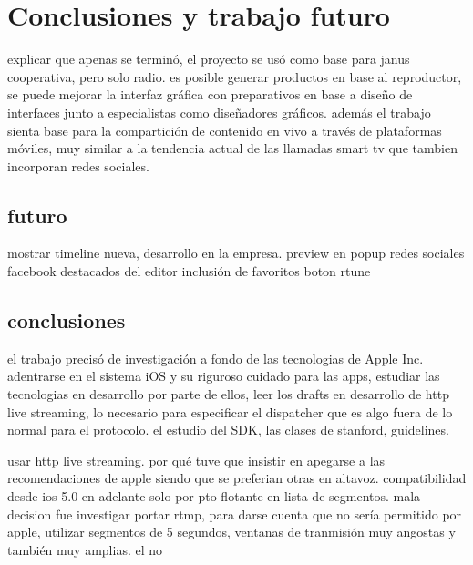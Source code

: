 
\chapter{Conclusiones y trabajo futuro}
explicar que apenas se terminó, el proyecto se usó como base para janus cooperativa, pero solo radio.
es posible generar productos en base al reproductor, se puede mejorar la interfaz gráfica con preparativos en base a diseño de interfaces junto a especialistas como diseñadores gráficos.
además el trabajo sienta base para la compartición de contenido en vivo a través de plataformas móviles, muy similar a la tendencia actual de las llamadas smart tv que tambien incorporan redes sociales.



	\section{futuro}
	mostrar timeline nueva, desarrollo en la empresa.
	preview en popup
	redes sociales facebook
	destacados del editor
	inclusión de favoritos
	boton rtune
	
	
	\section{conclusiones}
	el trabajo precisó de investigación a fondo de las tecnologias de Apple Inc. adentrarse en el sistema iOS y su riguroso cuidado para las apps, estudiar las tecnologias en desarrollo por parte de ellos, leer los drafts en desarrollo de http live streaming, lo necesario para especificar el dispatcher que es algo fuera de lo normal para el protocolo.
	el estudio del SDK, las clases de stanford, guidelines.

	usar http live streaming.
	por qué tuve que insistir en apegarse a las recomendaciones de apple siendo que se preferian otras en altavoz.
	compatibilidad desde ios 5.0 en adelante	solo por pto flotante en lista de segmentos.
	mala decision fue investigar portar rtmp, para darse cuenta que no sería permitido por apple, utilizar segmentos de 5 segundos, ventanas de tranmisión muy angostas y también muy amplias. el no 
	
		
	
